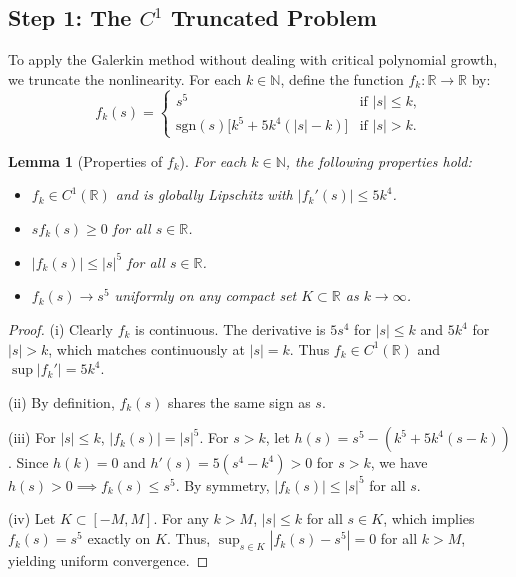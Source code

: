 \documentclass[11pt,letterpaper]{amsart}
\newtheorem{lemma}[theorem]{Lemma}
\begin{document}
\subsection{Step 1: The $C^1$ Truncated Problem}
To apply the Galerkin method without dealing with critical polynomial growth, we truncate the nonlinearity. For each $k \in \mathbb{N}$, define the function $f_k: \mathbb{R} \to \mathbb{R}$ by:
\begin{equation}\label{eq:fk_def}
f_k(s) =
\begin{cases}
s^5 & \text{if } |s| \le k, \\
\text{sgn}(s) \big[ k^5 + 5k^4(|s| - k) \big] & \text{if } |s| > k.
\end{cases}
\end{equation}

\begin{lemma}[Properties of $f_k$]\label{lem:fk_prop}
For each $k \in \mathbb{N}$, the following properties hold:
\begin{itemize}
    \item[(i)] $f_k \in C^1(\mathbb{R})$ and is globally Lipschitz with $|f_k'(s)| \le 5k^4$.
    \smallskip
    \item[(ii)] $s f_k(s) \ge 0$ for all $s \in \mathbb{R}$.
    \smallskip
    \item[(iii)] $|f_k(s)| \le |s|^5$ for all $s \in \mathbb{R}$.
    \smallskip
    \item[(iv)] $f_k(s) \to s^5$ uniformly on any compact set $K \subset \mathbb{R}$ as $k \to \infty$.
\end{itemize}
\end{lemma}
\begin{proof}
(i) Clearly $f_k$ is continuous. The derivative is $5s^4$ for $|s| \le k$ and $5k^4$ for $|s| > k$, which matches continuously at $|s|=k$. Thus $f_k \in C^1(\mathbb{R})$ and $\sup |f_k'| = 5k^4$.


(ii) By definition, $f_k(s)$ shares the same sign as $s$.

(iii) For $|s| \le k$, $|f_k(s)| = |s|^5$. For $s > k$, let $h(s) = s^5 - (k^5 + 5k^4(s-k))$. Since $h(k)=0$ and $h'(s) = 5(s^4 - k^4) > 0$ for $s > k$, we have $h(s) > 0 \implies f_k(s) \le s^5$. By symmetry, $|f_k(s)| \le |s|^5$ for all $s$.



(iv) Let $K \subset [-M, M]$. For any $k > M$, $|s| \le k$ for all $s \in K$, which implies $f_k(s) = s^5$ exactly on $K$. Thus, $\sup_{s \in K} |f_k(s) - s^5| = 0$ for all $k > M$, yielding uniform convergence.
\end{proof}
\end{document}
